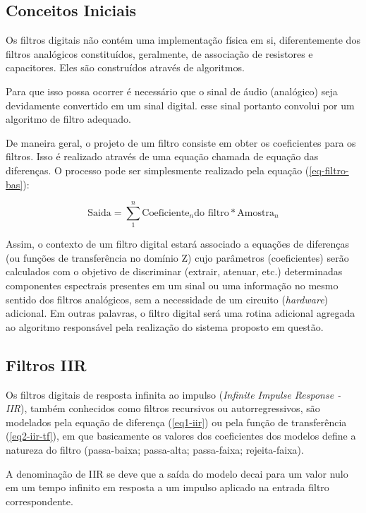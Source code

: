 	\subsection{Conceitos Iniciais}
	
		Os filtros digitais não contém uma implementação física em si, diferentemente dos filtros analógicos constituídos, geralmente, de associação de resistores e capacitores. Eles são construídos através de algoritmos.
		
		Para que isso possa ocorrer é necessário que o sinal de áudio (analógico) seja devidamente convertido em um sinal digital. esse sinal portanto convolui por um algoritmo de filtro adequado.
		
		De maneira geral, o projeto de um filtro consiste em obter os coeficientes para os filtros. Isso é realizado através de uma equação chamada de equação das diferenças. O processo pode ser simplesmente realizado pela equação (\ref{eq-filtro-bas}):
		
		\begin{equation}
			\text{Saida} = \sum_{1}^{n} \text{Coeficiente}_n \text{do filtro} * \text{Amostra}_n
			\label{eq-filtro-bas}
		\end{equation}
		
		Assim, o contexto de um filtro digital estará associado a equações de diferenças (ou funções de transferência no domínio Z) cujo parâmetros (coeficientes) serão calculados com o objetivo de discriminar (extrair, atenuar, etc.) determinadas componentes espectrais presentes em um sinal ou uma informação no mesmo sentido dos filtros analógicos, sem a necessidade de um circuito (\textit{hardware}) adicional. Em outras palavras, o filtro digital será uma rotina adicional agregada ao algoritmo responsável pela realização do sistema proposto em questão.
		
	\subsection{Filtros IIR}
	\label{secao-IIR-section}
		
		Os filtros digitais de resposta infinita ao impulso (\textit{Infinite Impulse Response - IIR}), também conhecidos como filtros recursivos ou autorregressivos, são modelados pela equação de diferença (\ref{eq1-iir}) ou pela função de transferência (\ref{eq2-iir-tf}), em que basicamente os valores dos coeficientes dos modelos define a natureza do filtro (passa-baixa; passa-alta; passa-faixa; rejeita-faixa).
		
		A denominação de IIR se deve que a saída do modelo decai para um valor nulo em um tempo infinito em resposta a um impulso aplicado na entrada filtro correspondente.
		
